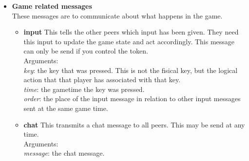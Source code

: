 \begin{itemize}
      \item \textbf{Game related messages} \\
      These messages are to communicate about what happens in the game.
        \begin{itemize}
          \item \textbf{input}
    This tells the other peers which input has been given. They need this input to update the game state and act accordingly. This message can only be send if you control the token.\\
    Arguments: \\
    \textit{key}: the key that was pressed. This is not the fisical key, but the logical action that that player has associated with that key. \\
    \textit{time}: the gametime the key was pressed. \\
    \textit{order}: the place of the input message in relation to other input messages sent at the same game time. \\

          \item \textbf{chat}
    This transmits a chat message to all peers. This may be send at any time. \\
    Arguments: \\
    \textit{message}: the chat message. \\

        \end{itemize}
    \end{itemize}

